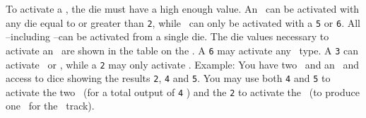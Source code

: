 To activate a \armament, the die must have a high enough value.  An \academy\ can be activated with any die equal to or greater than \texttt{2}, while \starships\ can only be activated with a \texttt{5} or \texttt{6}.  All \armaments--including \battleships--can be activated from a single die.  The die values necessary to activate an \armament\ are shown in the table on the \planetsheet.
\newline\newline
A \texttt{6} may activate any \armament\ type. A \texttt{3} can activate \factory\ or \academy, while a \texttt{2} may only activate \academy.
\newline\newline
Example: You have two \labs\ and an \academy\ and access to dice showing the results \texttt{2}, \texttt{4} and \texttt{5}.  You may use both \texttt{4} and \texttt{5} to activate the two \labs\ (for a total output of \texttt{4} \tech) and the \texttt{2} to activate the \academy\ (to produce one \astronaut\ for the \population\ track).


